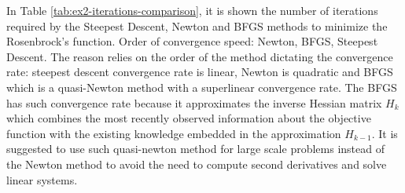 \documentclass[unicode,11pt,a4paper,oneside,numbers=endperiod,openany]{scrartcl}
\newcommand{\myvec}[1]{\begin{bmatrix} #1 \end{bmatrix}}
\newcommand{\myex}[1]{\begin{equation*}\begin{aligned} #1 \end{aligned}\end{equation*}}
\begin{document}
In Table \ref{tab:ex2-iterations-comparison}, it is shown the number of iterations required by
the Steepest Descent, Newton and BFGS methods to minimize the Rosenbrock's function.
Order of convergence speed: Newton, BFGS, Steepest Descent.
The reason relies on the order of the method dictating the convergence rate:
steepest descent convergence rate is linear, 
Newton is quadratic 
and BFGS which is a quasi-Newton method with a superlinear convergence rate.
The BFGS has such convergence rate because it approximates the inverse Hessian matrix $H_k$ 
which combines the most recently observed information about the objective function 
with the existing knowledge embedded in the approximation $H_{k-1}$.
It is suggested to use such quasi-newton method for large scale problems instead of the Newton method
to avoid the need to compute second derivatives and solve linear systems.
\clearpage









\end{document}
